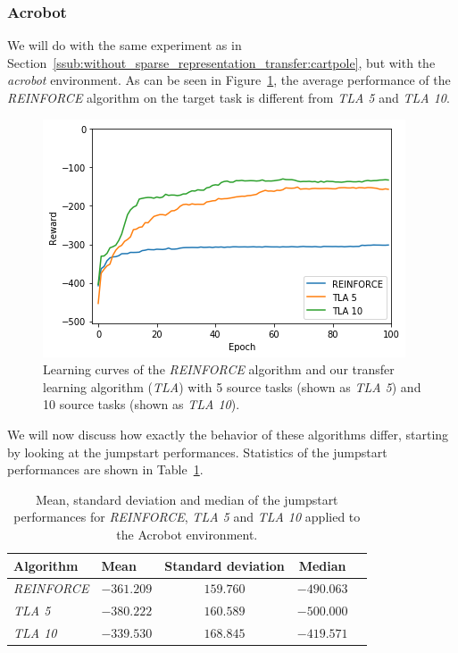 \subsubsection{Acrobot} %
\label{ssub:without_sparse_representation_transfer:acrobot}
We will do with the same experiment as in Section~\ref{ssub:without_sparse_representation_transfer:cartpole}, but with the \textit{acrobot} environment.
As can be seen in Figure~\ref{fig:Acrobot:reward_target_re-akt5-akt10}, the average performance of the \textit{REINFORCE} algorithm on the target task is different from \textit{TLA 5} and \textit{TLA 10}.
\begin{figure}[htb]
    \centering
    \includegraphics[width=.8\linewidth]{images/results/Acrobot/no_sparse_transfer/reward_target_re-akt5-akt10.png}
    \caption[Learning curves for the \textit{acrobot} environment of \textit{REINFORCE} and \textit{TLA} for the \emph{Acrobot} environment]{Learning curves of the \textit{REINFORCE} algorithm and our transfer learning algorithm (\textit{TLA}) with 5 source tasks (shown as \textit{TLA 5}) and 10 source tasks (shown as \textit{TLA 10}).}
    \label{fig:Acrobot:reward_target_re-akt5-akt10}
\end{figure}
We will now discuss how exactly the behavior of these algorithms differ, starting by looking at the jumpstart performances. Statistics of the jumpstart performances are shown in Table~\ref{tab:acrobot:nosparse:stats}.
\begin{table}[htb]
    \centering
    \begin{tabular}{llccc}
    \hline
    Algorithm & Mean & Standard deviation & Median \\
    \hline
       \textit{REINFORCE}  & $-361.209$ & $\bm{159.760}$ & $-490.063$ \\
       \textit{TLA 5} & $-380.222$ & $160.589$ & $-500.000$ \\
       \textit{TLA 10} & $\bm{-339.530}$ & $168.845$ & $\bm{-419.571}$ \\
    \hline
    \end{tabular}
    \caption{Mean, standard deviation and median of the jumpstart performances for \textit{REINFORCE}, \textit{TLA 5} and \textit{TLA 10} applied to the Acrobot environment.}
    \label{tab:acrobot:nosparse:stats}
\end{table}
